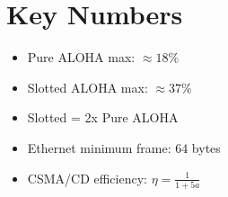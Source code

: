 \documentclass[11pt]{article}
\begin{document}
\section{Key Numbers}

\begin{itemize}
\item Pure ALOHA max: $\approx 18\%$
\item Slotted ALOHA max: $\approx 37\%$
\item Slotted = 2x Pure ALOHA
\item Ethernet minimum frame: $64$ bytes
\item CSMA/CD efficiency: $\eta = \frac{1}{1 + 5a}$
\end{itemize}
\end{document}
